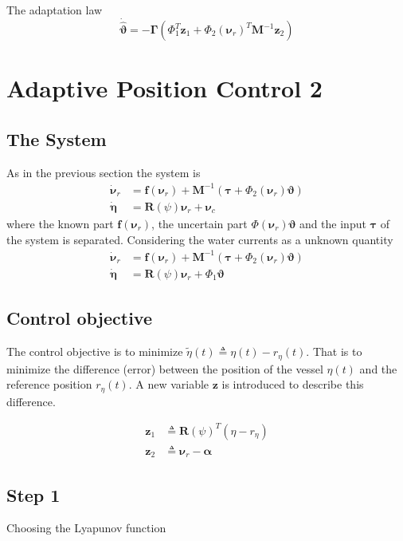 \documentclass[12pt,a4]{article}
\begin{document}
The adaptation law
\begin{equation}
	\bm{\dot{\hat{\vartheta}}} = - \bm{\Gamma} \left( \Phi_1^T\bm{z}_1 +  \Phi_2 (\bm{\nu}_r )^T\bm{M}^{-1}\bm{z}_2 \right)
\end{equation}

\section{Adaptive Position Control 2}

\subsection{The System}
As in the previous section the system is
\begin{align}
	\bm{\dot{\nu}}_r & = \bm{f}(\bm{\nu}_r) + \bm{M}^{-1}\left( \bm{\tau} + \Phi_2 (\bm{\nu}_r )\bm{\vartheta} \right) \\
	\bm{\dot{\eta}}  & = \bm{R}(\psi)\bm{\nu}_r + \bm{\nu}_c
\end{align}
where the known part $\bm{f}(\bm{\nu}_r)$, the uncertain part $\Phi(\bm{\nu}_r )\bm{\vartheta}$ and the input $\bm{\tau}$
of the system is separated. Considering the water currents as a unknown quantity
\begin{align}
	\bm{\dot{\nu}}_r & = \bm{f}(\bm{\nu}_r) + \bm{M}^{-1} \left( \bm{\tau} + \Phi_2 (\bm{\nu}_r )\bm{\vartheta} \right) \\
	\bm{\dot{\eta}}  & = \bm{R}(\psi)\bm{\nu}_r + \Phi_1\bm{\vartheta}
\end{align}

\subsection{Control objective}
The control objective is to minimize $\tilde{\eta}(t) \triangleq \eta(t) - r_{\eta}(t)$.
That is to minimize the difference (error) between the position of the vessel $\eta(t)$ and the reference position $r_{\eta}(t)$.
A new variable $\bm{z}$ is introduced to describe this difference.

\begin{align}
	\bm{z}_1 & \triangleq \bm{R}(\psi)^T(\eta - r_{\eta}) \\
	\label{eq:z2}
	\bm{z}_2 & \triangleq \bm{\nu}_r - \bm{\alpha}
\end{align}

\subsection{Step 1}
Choosing the Lyapunov function
\end{document}
